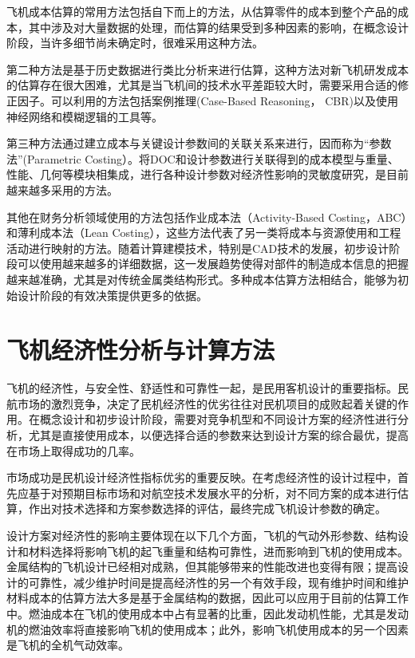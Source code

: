 飞机成本估算的常用方法包括自下而上的方法，从估算零件的成本到整个产品的成本，其中涉及对大量数据的处理，而估算的结果受到多种因素的影响，在概念设计阶段，当许多细节尚未确定时，很难采用这种方法。

第二种方法是基于历史数据进行类比分析来进行估算，这种方法对新飞机研发成本的估算存在很大困难，尤其是当飞机间的技术水平差距较大时，需要采用合适的修正因子。可以利用的方法包括案例推理(Case-Based Reasoning， CBR)以及使用神经网络和模糊逻辑的工具等。

第三种方法通过建立成本与关键设计参数间的关联关系来进行，因而称为“参数法”(Parametric Costing）。将DOC和设计参数进行关联得到的成本模型与重量、性能、几何等模块相集成，进行各种设计参数对经济性影响的灵敏度研究，是目前越来越多采用的方法。

其他在财务分析领域使用的方法包括作业成本法（Activity-Based Costing，ABC）和薄利成本法（Lean Costing），这些方法代表了另一类将成本与资源使用和工程活动进行映射的方法。随着计算建模技术，特别是CAD技术的发展，初步设计阶段可以使用越来越多的详细数据，这一发展趋势使得对部件的制造成本信息的把握越来越准确，尤其是对传统金属类结构形式。多种成本估算方法相结合，能够为初始设计阶段的有效决策提供更多的依据。

\section{飞机经济性分析与计算方法}\label{c13.2}
飞机的经济性，与安全性、舒适性和可靠性一起，是民用客机设计的重要指标。民航市场的激烈竞争，决定了民机经济性的优劣往往对民机项目的成败起着关键的作用。在概念设计和初步设计阶段，需要对竞争机型和不同设计方案的经济性进行分析，尤其是直接使用成本，以便选择合适的参数来达到设计方案的综合最优，提高在市场上取得成功的几率。

市场成功是民机设计经济性指标优劣的重要反映。在考虑经济性的设计过程中，首先应基于对预期目标市场和对航空技术发展水平的分析，对不同方案的成本进行估算，作出对技术选择和方案参数选择的评估，最终完成飞机设计参数的确定。

设计方案对经济性的影响主要体现在以下几个方面，飞机的气动外形参数、结构设计和材料选择将影响飞机的起飞重量和结构可靠性，进而影响到飞机的使用成本。金属结构的飞机设计已经相对成熟，但其能够带来的性能改进也变得有限；提高设计的可靠性，减少维护时间是提高经济性的另一个有效手段，现有维护时间和维护材料成本的估算方法大多是基于金属结构的数据，因此可以应用于目前的估算工作中。燃油成本在飞机的使用成本中占有显著的比重，因此发动机性能，尤其是发动机的燃油效率将直接影响飞机的使用成本；此外，影响飞机使用成本的另一个因素是飞机的全机气动效率。

